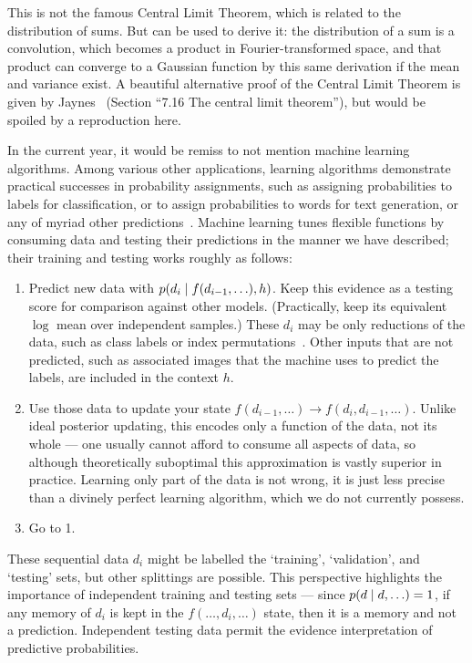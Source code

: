 This is not the famous Central Limit Theorem, which is related to the
distribution of sums.
But can be used to derive it: the distribution of a sum is a convolution, which
becomes a product in Fourier-transformed space, and that product can converge
to a Gaussian function by this same derivation if the mean and variance exist.
A beautiful alternative proof of the Central Limit Theorem is given by
Jaynes~\cite{jaynes2003probability}
(Section ``7.16 The central limit theorem''), but would be spoiled by a
reproduction here.

In the current year, it would be remiss to not mention machine learning
algorithms.
Among various other applications, learning algorithms demonstrate practical
successes in probability assignments, such as assigning
probabilities to labels for classification,
or to assign probabilities to words for text
generation, or any of myriad other
predictions~\cite{MurphyKevinP.2012Mlap, radford2019language}.
Machine learning tunes flexible functions by consuming data and testing their
predictions in the manner we have described; their training and testing works
roughly as follows:
\begin{enumerate}
\item Predict new data with $p(d_i \mid f(d_{i-1}, \ldots), h)$.
Keep this evidence as a testing score for comparison against other models.
(Practically, keep its equivalent $\log$ mean over independent samples.)
These $d_i$ may be only reductions of the data, such as class labels
or index permutations~\cite{Noroozi2016jigsaw, multitaskself2017}.
Other inputs that are not predicted, such as associated images that the machine
uses to predict the labels, are included in the context $h$.
\item Use those data to update your state
$f(d_{i-1}, \ldots) \rightarrow f(d_i, d_{i-1}, \ldots)$.
Unlike ideal posterior updating, this encodes only a function of the data, not
its whole --- one usually cannot afford to consume all aspects of data, so
although theoretically suboptimal this approximation is vastly superior in
practice.
Learning only part of the data is not wrong, it is just less precise than a
divinely perfect learning algorithm, which we do not currently possess.
\item Go to 1.
\end{enumerate}
These sequential data $d_i$ might be labelled the `training', `validation',
and `testing' sets, but other splittings are possible.
This perspective highlights the importance of independent training and testing
sets --- since $p(d \mid d, \ldots) = 1$, if any memory of $d_i$ is kept in
the $f(\ldots, d_i, \ldots)$ state, then it is a memory and not a prediction.
Independent testing data permit the evidence interpretation of predictive
probabilities.


